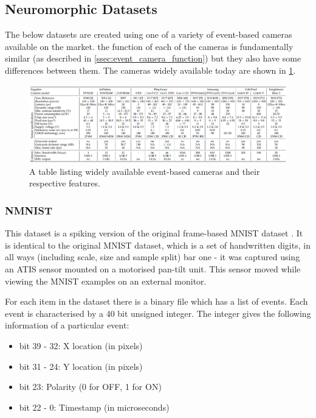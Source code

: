 \subsection{Neuromorphic Datasets} \label{ssec:neuromorphic_datasets}

The below datasets are created using one of a variety of event-based cameras available on the market. the function of each of the cameras is fundamentally similar (as described in \cref{ssec:event_camera_function}) but they also have some differences between them. The cameras widely available today are shown in \cref{fig:camera_models}.

\begin{figure}[htb]
      \centering
      \includegraphics[width=\textwidth]{background/images/camera_models.png}
      \caption{A table listing widely available event-based cameras and their respective features\cite{EventBasedVisionASurvery}.}
      \label{fig:camera_models}
\end{figure}

\subsubsection{NMNIST} \label{sssec:nmnist}

This dataset is a spiking version of the original frame-based MNIST dataset \cite{MNIST}\cite{NMNIST}. It is identical to the original MNIST dataset, which is a set of handwritten digits, in all ways (including scale, size and sample split) bar one - it was captured using an ATIS sensor mounted on a motorised pan-tilt unit. This sensor moved while viewing the MNIST examples on an external monitor.

For each item in the dataset there is a binary file which has a list of events. Each event is characterised by a 40 bit unsigned integer. The integer gives the following information of a particular event:

\begin{itemize}
      \item bit 39 - 32: X location (in pixels)
      \item bit 31 - 24: Y location (in pixels)
      \item bit 23: Polarity (0 for OFF, 1 for ON)
      \item bit 22 - 0: Timestamp (in microseconds)
\end{itemize}

